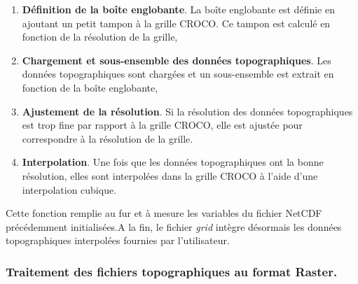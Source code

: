 {\begin{enumerate}
	\item \textbf{Définition de la boîte englobante}. La boîte englobante est définie en ajoutant un petit tampon à la grille CROCO. Ce tampon est calculé en fonction de la résolution de la grille,

	\item \textbf{Chargement et sous-ensemble des données topographiques}. Les données topographiques sont chargées et un sous-ensemble est extrait en fonction de la boîte englobante,

	\item \textbf{Ajustement de la résolution}. Si la résolution des données topographiques est trop fine par rapport à la grille CROCO, elle est ajustée pour correspondre à la résolution de la grille.

	\item \textbf{Interpolation}. Une fois que les données topographiques ont la bonne résolution, elles sont interpolées dans la grille CROCO à l'aide d'une interpolation cubique.
\end{enumerate}

Cette fonction remplie au fur et à mesure les variables du fichier NetCDF précédemment initialisées.A la fin, le fichier \og \textit{grid} \fg{} intègre désormais les données topographiques interpolées fournies par l'utilisateur.

\subsubsection{Traitement des fichiers topographiques au format Raster.}

\begin{figure}[h]
	\centering
\end{figure}}
